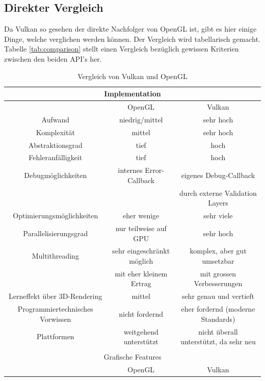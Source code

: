 \documentclass[titlepage, 11pt, a4paper, ngerman]{article}
\begin{document}
\subsection{Direkter Vergleich}
Da Vulkan so gesehen der direkte Nachfolger von \acrshort{OpenGL} ist, gibt es hier einige Dinge, welche verglichen werden können. Der Vergleich wird tabellarisch gemacht. Tabelle \ref{tab:comparison} stellt einen Vergleich bezüglich gewissen Kriterien zwischen den beiden \acrshort{API}'s her.
\begin{table}[ht]
    \centering
    \caption[Vergleich von Vulkan und \acrshort{OpenGL}]{Vergleich von Vulkan und \acrshort{OpenGL}}
    \bigbreak
    \begin{tabular}{|c||c|c|}
        \hline
        \multicolumn{3}{|c|}{Implementation} \\
        \hline
        \hline
         & \acrshort{OpenGL} & Vulkan \\
        \hline
        Aufwand & niedrig/mittel & sehr hoch \\
        Komplexität & mittel & sehr hoch \\
        Abstraktionsgrad & tief & hoch \\
        Fehleranfälligkeit & tief & hoch \\
        Debugmöglichkeiten & internes Error-Callback & eigenes Debug-Callback \\ & & durch externe Validation Layers \\
        Optimierungsmöglichkeiten & eher wenige & sehr viele \\
        Parallelisierungsgrad & nur teilweise auf GPU & sehr hoch \\
        \gls{Multithreading} & sehr eingeschränkt möglich & komplex, aber gut umsetzbar \\ & mit eher kleinem Ertrag & mit grossen Verbesserungen \\
        Lerneffekt über 3D-\gls{Rendering} & mittel & sehr genau und vertieft \\
        Programmiertechnisches Vorwissen & nicht fordernd & eher fordernd (moderne Standards) \\
        Plattformen & weitgehend unterstützt & nicht überall unterstützt, da sehr neu \\
        \hline
        \multicolumn{3}{c}{} \\
        \hline
        \multicolumn{3}{|c|}{Grafische Features} \\
        \hline
        \hline
         & \acrshort{OpenGL} & Vulkan \\

\end{tabular}
\end{table}
\end{document}
